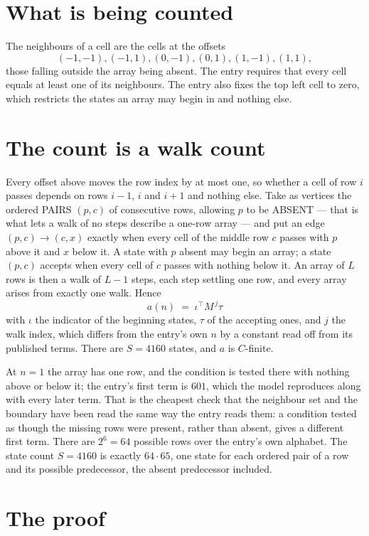\documentclass[11pt,a4paper]{article}
\theoremstyle{plain}
\theoremstyle{definition}
\begin{document}
\section{What is being counted}

The neighbours of a cell are the cells at the offsets
\[
(-1,-1), (-1,1), (0,-1), (0,1), (1,-1), (1,1),
\]
those falling outside the array being absent. The entry requires that every cell equals at least one of its neighbours. The entry also fixes the top left cell to zero, which restricts the states an array may begin in and nothing else.

\section{The count is a walk count}

Every offset above moves the row index by at most one, so whether a cell of row $i$ passes
depends on rows $i-1$, $i$ and $i+1$ and nothing else. Take as vertices the ordered PAIRS
$(p,c)$ of consecutive rows, allowing $p$ to be ABSENT --- that is what lets a walk of no steps
describe a one-row array --- and put an edge $(p,c)\to(c,x)$ exactly when every cell of the
middle row $c$ passes with $p$ above it and $x$ below it. A state with $p$ absent may begin an
array; a state $(p,c)$ accepts when every cell of $c$ passes with nothing below it. An array of
$L$ rows is then a walk of $L-1$ steps, each step settling one row, and every array arises from
exactly one walk. Hence
\[
a(n)\;=\;\iota^{\!\top}M^{\,j}\tau
\]
with $\iota$ the indicator of the beginning states, $\tau$ of the accepting ones, and $j$ the
walk index, which differs from the entry's own $n$ by a constant read off from its published
terms. There are $S=4160$ states, and $a$ is $C$-finite.

At $n=1$ the array has one row, and
the condition is tested there with nothing above or below it; the entry's first term is
$601$, which the model reproduces along with every later term. That is the cheapest check
that the neighbour set and the boundary have been read the same way the entry reads them: a
condition tested as though the missing rows were present, rather than absent, gives a different
first term. There are $2^{6}=64$ possible rows over the entry's own alphabet. The state count $S=4160$ is exactly $64\cdot65$,
one state for each ordered pair of a row and its possible predecessor, the absent predecessor
included.

\section{The proof}
\end{document}
